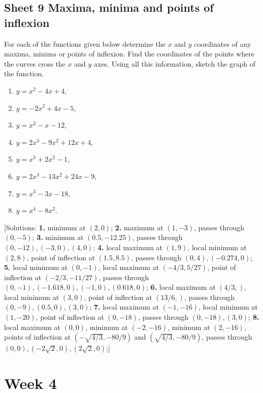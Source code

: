 \documentclass[
  english,
  11pt,
  oneside]{book}
\providecommand{\tightlist}{%
  \setlength{\itemsep}{0pt}\setlength{\parskip}{0pt}}
\newcommand{\slide}{}
\theoremstyle{definition}
\theoremstyle{definition}
\theoremstyle{definition}
\theoremstyle{definition}
\theoremstyle{remark}
\begin{document}
\slide

\section{Sheet 9 Maxima, minima and points of inflexion}\label{sheet-9-maxima-minima-and-points-of-inflexion}

For each of the functions given below determine the \(x\) and \(y\) coordinates of any maxima, minima or points of inflexion. Find the coordinates of the points where the curves cross the \(x\) and \(y\) axes. Using all this information, sketch the graph of the function.

\begin{enumerate}
\def\labelenumi{\arabic{enumi}.}
\tightlist
\item
  \(y=x^2-4x+4\),
\item
  \(y=-2x^2+4x-5\),
\item
  \(y=x^2-x-12\),
\item
  \(y=2x^3-9x^2+12x+4\),
\item
  \(y=x^3+2x^2-1\),
\item
  \(y=2x^3−13x^2+24x−9\),
\item
  \(y=x^3-3x-18\),
\item
  \(y=x^4-8x^2\).
\end{enumerate}

{[}Solutions:
\textbf{1.} minimum at \((2,0)\);
\textbf{2.} maximum at \((1,-3)\), passes through \((0,-5)\);
\textbf{3.} minimum at \((0.5,-12.25)\), passes through \((0,-12), (-3,0), (4,0)\);
\textbf{4.} local maximum at \((1,9)\), local minimum at \((2,8)\), point of inflection at \((1.5,8.5)\), passes through \((0,4), (-0.274,0)\);
\textbf{5.} local minimum at \((0,-1)\), local maximum at \((-4/3,5/27)\), point of inflection at \((-2/3,-11/27)\), passes through \((0,-1), (-1.618,0), (-1,0), (0.618,0)\);
\textbf{6.} local maximum at \((4/3, )\), local minimum at \((3,0)\), point of inflection at \((13/6,)\), passes through \((0,-9), (0.5,0), (3,0)\);
\textbf{7.} local maximum at \((-1,-16)\), local minimum at \((1,-20)\), point of inflection at \((0,-18)\), passes through \((0,-18), (3,0)\);
\textbf{8.} local maximum at \((0,0)\), minimum at \((-2,-16)\), minimum at \((2,-16)\), points of inflection at \((-\sqrt{4/3},-80/9)\) and \((\sqrt{4/3},-80/9)\), passes through \((0,0), (-2\sqrt{2},0), (2\sqrt{2},0)\);{]}

\chapter{Week 4}\label{week-four}
\end{document}
